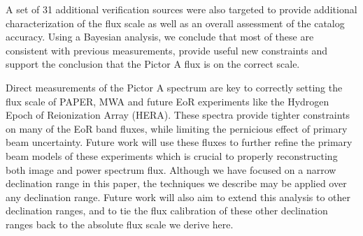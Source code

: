\documentclass[preprint]{aastex}
\begin{document}
A set of  31 additional verification sources were also targeted to provide additional 
characterization of the flux scale as well as an overall assessment of the catalog accuracy.
Using a Bayesian analysis, we conclude that most of
these are consistent with previous measurements, provide useful new
constraints and support the conclusion that the Pictor A flux is on the correct scale.

Direct measurements of the Pictor A spectrum are key to correctly setting the
flux scale of PAPER, MWA and future EoR experiments like the Hydrogen Epoch of Reionization Array (HERA).
These spectra provide tighter constraints on many of the EoR band fluxes, while
limiting the pernicious effect of primary beam uncertainty.  Future work will use these
fluxes to further refine the primary beam models of these experiments which is crucial to properly reconstructing
both image and power spectrum flux.
Although we have focused on a narrow declination range in this paper, the techniques we describe
may be applied over any declination range.  Future work will also aim to extend this analysis
to other declination ranges, and to tie the flux calibration of these other declination ranges
back to the absolute flux scale we derive here.
\end{document}
